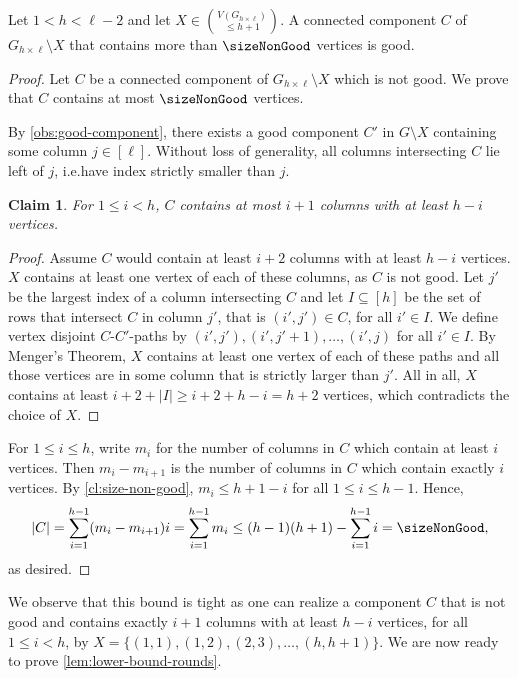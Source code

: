 \documentclass{lmcs}
\theoremstyle{plain}\newtheorem{claim}[thm]{Claim}   %
\newenvironment{claimproof}{\begin{proof}}{\renewcommand{\qedsymbol}{\ensuremath{\blacksquare}}\end{proof}}
\newcommand{\grid}[2]{\ensuremath{G_{#1 \times #2}}}
\begin{document}
\begin{lem}
	\label{lem:size-non-good}
	Let $1<h<\ell-2$ and let $X\in \binom{V(\grid{h}{\ell})}{\leq h+1}$.
	A connected component $C$ of $\grid{h}{\ell}\setminus X$ that contains more than $\sizeNonGood$ vertices is good.
\end{lem}

\begin{proof}
	Let $C$ be a connected component of $\grid{h}{\ell}\setminus X$ which is not good.
	We prove that $C$ contains at most $\sizeNonGood$ vertices.
	
	By \autoref{obs:good-component}, there exists a good component $C'$ in $G \setminus X$ containing some column $j \in [\ell]$. Without loss of generality, all columns intersecting $C$ lie left of $j$, i.e.\@ have index strictly smaller than $j$.
	
	\begin{claim} \label{cl:size-non-good}
		For $1\leq i<h$,
		$C$ contains at most $i+1$ columns with at least $h-i$ vertices.
	\end{claim}
	\begin{claimproof}
		Assume $C$ would contain at least $i+2$ columns with at least $h-i$ vertices.
		$X$ contains at least one vertex of each of these columns, as $C$ is not good.
		Let $j'$ be the largest index of a column intersecting $C$ and let $I \subseteq [h]$ be the set of rows that intersect $C$ in column $j'$, that is $(i',j')\in C$, for all $i'\in I$.
		We define vertex disjoint $C$-$C'$-paths by $(i',j'),(i',j'+1),\ldots,(i',j)$ for all $i' \in I$.
		By Menger's Theorem, $X$ contains at least one vertex of each of these paths and all those vertices are in some column that is strictly larger than $j'$.
		All in all, $X$ contains at least $i+2+|I|\geq i+2+h-i=h+2$ vertices, which contradicts the choice of $X$.
	\end{claimproof}
	
	For $1 \leq i \leq h$, write $m_i$ for the number of columns in $C$ which contain at least $i$ vertices. Then $m_i - m_{i+1}$ is the number of columns in $C$ which contain exactly $i$ vertices. 
	By \autoref{cl:size-non-good}, $m_i \leq h +1 - i$ for all $1 \leq i \leq h-1$.
	Hence,
	\[
	|C| = \sum_{i = 1}^{h-1} (m_i - m_{i+1}) i = \sum_{i=1}^{h-1} m_i \leq (h-1)(h+1) - \sum_{i=1}^{h-1} i = \sizeNonGood,
	\]
	as desired.
\end{proof}

We observe that this bound is tight as one can realize a component $C$ that is not good and contains exactly $i+1$ columns with at least $h-i$ vertices, for all $1\leq i<h$, by $X=\{(1,1),(1,2),(2,3),\ldots,(h,h+1)\}$.
We are now ready to prove \autoref{lem:lower-bound-rounds}.
\end{document}
